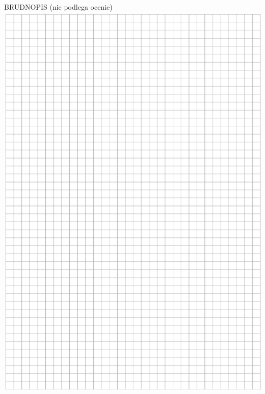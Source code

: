 \documentclass[10pt]{article}
\begin{document}
BRUDNOPIS (nie podlega ocenie)\\
\includegraphics[max width=\textwidth, center]{2024_11_21_51cb67544fb9b029f01cg-29}\\
\end{document}
